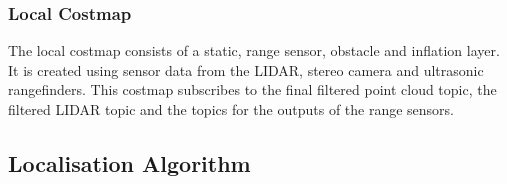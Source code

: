 \subsubsection{Local Costmap}
The local costmap consists of a static, range sensor, obstacle and inflation layer. It is created using sensor data from the LIDAR, stereo camera and ultrasonic rangefinders. This costmap subscribes to the final filtered point cloud topic, the filtered LIDAR topic and the topics for the outputs of the range sensors.

\subsection{Localisation Algorithm}



